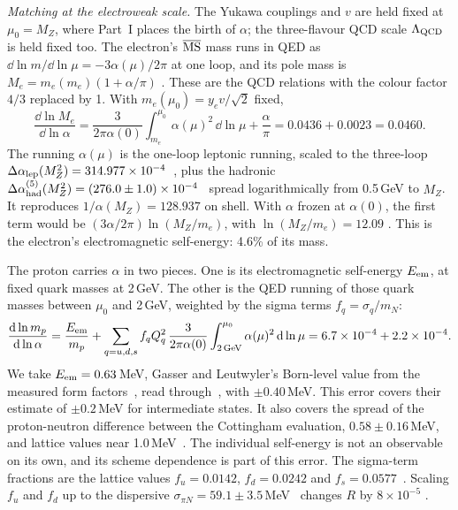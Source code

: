 \emph{Matching at the electroweak scale.} The Yukawa couplings and $v$ are held fixed at $\mu_0=M_Z$, where Part~I places the birth of $\alpha$;
the three-flavour QCD scale $\Lambda_{\rm QCD}$ is held fixed too. The electron's $\overline{\rm MS}$ mass runs in QED as
$\dd\ln m/\dd\ln\mu=-3\alpha(\mu)/2\pi$ at one loop, and its pole mass is $M_e=m_e(m_e)(1+\alpha/\pi)$ \tagP. These are the QCD relations with the colour
factor $4/3$ replaced by 1. With $m_e(\mu_0)=y_ev/\sqrt2$ fixed,
\begin{equation}\label{eq:sm-me}
\frac{\dd\ln M_e}{\dd\ln\alpha}=\frac{3}{2\pi\alpha(0)}\int_{m_e}^{\mu_0}\alpha(\mu)^2\,\dd\ln\mu+\frac{\alpha}{\pi}=0.0436+0.0023=0.0460 .
\end{equation}
The running $\alpha(\mu)$ is the one-loop leptonic running, scaled to the three-loop $\Delta\alpha_{\rm lep}(M_Z^2)=314.977\times10^{-4}$~\cite{steinhauser1998},
plus the hadronic $\Delta\alpha^{(5)}_{\rm had}(M_Z^2)=(276.0\pm1.0)\times10^{-4}$~\cite{davier2020} spread logarithmically from 0.5\,GeV to $M_Z$. It
reproduces $1/\alpha(M_Z)=128.937$ on shell. With $\alpha$ frozen at $\alpha(0)$, the first term would be $(3\alpha/2\pi)\ln(M_Z/m_e)$, with
$\ln(M_Z/m_e)=12.09$ . This is the electron's electromagnetic self-energy: 4.6\% of its mass.

The proton carries $\alpha$ in two pieces. One is its electromagnetic self-energy $E_{\rm em}$, at fixed quark masses at 2\,GeV. The other is the
QED running of those quark masses between $\mu_0$ and 2\,GeV, weighted by the sigma terms $f_q=\sigma_q/m_N$:
\begin{equation}\label{eq:sm-mp}
\frac{\mathrm{d}\ln m_p}{\mathrm{d}\ln\alpha}=\frac{E_{\rm em}}{m_p}+\sum_{q=u,d,s}f_qQ_q^2\,\frac{3}{2\pi\alpha(0)}\int_{2\,{\rm GeV}}^{\mu_0}\alpha(\mu)^2\,\mathrm{d}\ln\mu
=6.7\times10^{-4}+2.2\times10^{-4}.
\end{equation}
We take $E_{\rm em}=0.63$\,MeV, Gasser and Leutwyler's Born-level value from the measured form factors~\cite{gasser1982}, read
through~\cite{stern2008}, with $\pm0.40$\,MeV. This error covers their estimate of $\pm0.2$\,MeV for intermediate states. It also covers the spread of
the proton-neutron difference between the Cottingham evaluation, $0.58\pm0.16$\,MeV, and lattice values near 1.0\,MeV~\cite{gasser2021}. The
individual self-energy is not an observable on its own, and its scheme dependence is part of this error. The sigma-term fractions are the
lattice values $f_u=0.0142$, $f_d=0.0242$ and $f_s=0.0577$~\cite{borsanyi2020}. Scaling $f_u$ and $f_d$ up to the dispersive
$\sigma_{\pi N}=59.1\pm3.5$\,MeV~\cite{hoferichter2015} changes $R$ by $8\times10^{-5}$ .

